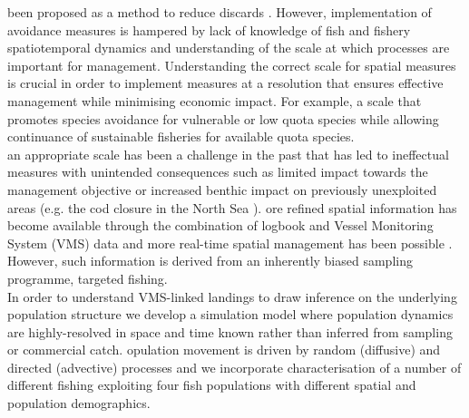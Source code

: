 \documentclass[review]{elsarticle}
\begin{document}
 been proposed as a method to reduce discards
. However,
 implementation of avoidance measures is hampered by lack
of knowledge of fish and fishery spatiotemporal dynamics and understanding of
the scale at which processes are important for management. Understanding the
correct scale for spatial measures is crucial in order to implement measures at
a resolution that ensures effective management \citep{Dunn2016} while
minimising economic impact.  For example, a scale that promotes species
avoidance for vulnerable or low quota species while allowing continuance of
sustainable fisheries for available quota species.\\

 an
appropriate scale has been a challenge in the past that has led to ineffectual
measures with unintended consequences such as limited impact towards the
management objective or increased benthic impact on previously unexploited
areas (e.g. the cod closure in the North Sea
\citep{Rijnsdorp2001,Dinmore2003}). ore
refined spatial information has  become available through
the combination of logbook and Vessel Monitoring System (VMS) data
\citep{Lee2010, Bastardie2010, Gerritsen2012, Mateo2016} and more real-time
spatial management has been possible \citep[e.g.][]{Holmes2011}.  However, such
information is derived from an inherently biased sampling programme, targeted
fishing. \\ 

In order to understand  VMS-linked landings to draw inference on the underlying
population structure we develop a simulation model where population dynamics
are highly-resolved in space and time
known  rather than inferred from sampling or commercial
catch. opulation movement is driven by random (diffusive) and directed
(advective) processes and we incorporate characterisation of a number of
different fishing  exploiting four fish populations
with different spatial and population demographics.\\
\end{document}
